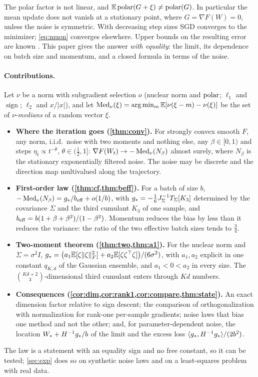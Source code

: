\documentclass{article}
\theoremstyle{plain}
\theoremstyle{definition}
\theoremstyle{remark}
\begin{document}
The polar factor is not linear, and $\mathbb{E}\operatorname{polar}(G+\xi)\ne\operatorname{polar}(G)$. In particular the mean update does not vanish at a
stationary point, where $G=\nabla F(W)=0$, unless the noise is symmetric. With decreasing step sizes SGD converges to
the minimizer; \eqref{eq:muon} converges elsewhere. Upper bounds on the resulting error are known
\citep{xie2026muon,chen2026when,do2026muon}. This paper gives the answer \emph{with equality}: the limit, its
dependence on batch size and momentum, and a closed formula in terms of the noise.

\paragraph{Contributions.} Let $\nu$ be a norm with subgradient selection $o$ (nuclear norm and $\operatorname{polar}$; $\ell_1$ and
$\operatorname{sign}$; $\ell_2$ and $x/|x|$), and let $\operatorname{Med}_\nu(\xi)=\arg\min_m\mathbb{E}[\nu(\xi-m)-\nu(\xi)]$ be the set of
$\nu$-\emph{medians} of a random vector $\xi$.
\begin{itemize}\setlength\itemsep{1pt}
\item \textbf{Where the iteration goes (\cref{thm:conv}).} For strongly convex smooth $F$, any norm, i.i.d.\ noise with
two moments and nothing else, any $\beta\in[0,1)$ and steps $\eta_t\propto t^{-\theta}$, $\theta\in(\frac12,1]$:
$\nabla F(W_t)\to-\operatorname{Med}_\nu(N_\beta)$ almost surely, where $N_\beta$ is the stationary exponentially filtered noise.
The noise may be discrete and the direction map multivalued along the trajectory.
\item \textbf{First-order law (\cref{thm:cf,thm:beff}).} For a batch of size $b$,
$-\operatorname{Med}_\nu(N_\beta)=g_\ast/b_{\mathrm{eff}}+o(1/b)$, with $g_\ast=-\frac16J_\Sigma^{-1}T_\Sigma[K_3]$ determined by the covariance $\Sigma$
and the third cumulant $K_3$ of one sample, and $b_{\mathrm{eff}}=b(1+\beta+\beta^2)/(1-\beta^2)$. Momentum reduces the bias by
less than it reduces the variance: the ratio of the two effective batch sizes tends to $\frac34$.
\item \textbf{Two-moment theorem (\cref{thm:two,thm:a1}).} For the nuclear norm and $\Sigma=\sigma^2I$,
$g_\ast=\big(a_1\mathbb{E}[\zeta\|\zeta\|_{F}^2]+a_2\mathbb{E}[\zeta\zeta^\top\zeta]\big)/(6\sigma^2)$,
with $a_1,a_2$ explicit in one constant $q_{K,d}$ of the Gaussian ensemble, and $a_1<0<a_2$ in every size. The
$\binom{Kd+2}{3}$-dimensional third cumulant enters through $Kd$ numbers.
\item \textbf{Consequences (\cref{cor:dim,cor:rank1,cor:compare,thm:state}).} An exact dimension factor relative to sign
descent; the comparison of orthogonalization with normalization for rank-one per-sample gradients; noise laws that
bias one method and not the other; and, for parameter-dependent noise, the location $W_\ast+H^{-1}g_\ast/b$ of the limit
and the excess loss $\langle g_\ast, H^{-1}g_\ast\rangle/(2b^2)$.
\end{itemize}
The law is a statement with an equality sign and no free constant, so it can be tested; \cref{sec:exp} does so on
synthetic noise laws and on a least-squares problem with real data.
\end{document}
